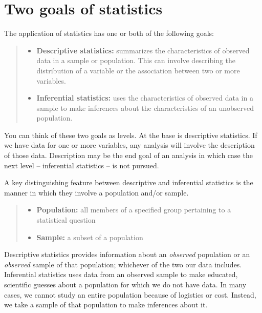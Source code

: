 \documentclass[
]{book}
\providecommand{\tightlist}{%
  \setlength{\itemsep}{0pt}\setlength{\parskip}{0pt}}
\begin{document}
\hypertarget{two-goals-of-statistics}{%
\section{Two goals of statistics}\label{two-goals-of-statistics}}

The application of statistics has one or both of the following goals:

\begin{quote}
\begin{itemize}
\tightlist
\item
  \textbf{Descriptive statistics:} summarizes the characteristics of observed data in a sample or population. This can involve describing the distribution of a variable or the association between two or more variables.
\item
  \textbf{Inferential statistics:} uses the characteristics of observed data in a sample to make inferences about the characteristics of an unobserved population.
\end{itemize}
\end{quote}

You can think of these two goals as levels. At the base is descriptive statistics. If we have data for one or more variables, any analysis will involve the description of those data. Description may be the end goal of an analysis in which case the next level -- inferential statistics -- is not pursued.

A key distinguishing feature between descriptive and inferential statistics is the manner in which they involve a population and/or sample.

\begin{quote}
\begin{itemize}
\tightlist
\item
  \textbf{Population:} all members of a specified group pertaining to a statistical question
\item
  \textbf{Sample:} a subset of a population
\end{itemize}
\end{quote}

Descriptive statistics provides information about an \emph{observed} population or an \emph{observed} sample of that population; whichever of the two our data includes. Inferential statistics uses data from an observed sample to make educated, scientific guesses about a population for which we do not have data. In many cases, we cannot study an entire population because of logistics or cost. Instead, we take a sample of that population to make inferences about it.
\end{document}
